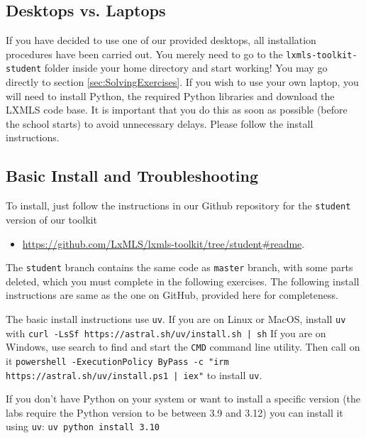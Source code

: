 \subsection{Desktops vs. Laptops}

If you have decided to use one of our provided desktops, all installation procedures have been carried out. You merely need to go to the \verb+lxmls-toolkit-student+ folder inside your home directory and start working! You may go directly to section \ref{sec:SolvingExercises}. If you wish to use your own laptop, you will need to install Python, the required Python libraries and download the LXMLS code base. It is important that you do this as soon as possible (before the school starts) to avoid unnecessary delays. Please follow the install instructions. 

\subsection{Basic Install and Troubleshooting}

To install, just follow the instructions in our Github repository for the \verb+student+ version of our toolkit 

\begin{itemize}
\item \url{https://github.com/LxMLS/lxmls-toolkit/tree/student#readme}. 
\end{itemize}

The \verb+student+ branch contains the same code as \verb+master+ branch, with some parts deleted, which you must complete in the following exercises. 
The following install instructions are same as the one on GitHub, provided here for completeness.

\noindent The basic install instructions use \texttt{uv}. 
If you are on Linux or MacOS, install \texttt{uv} with \newline
\texttt{curl -LsSf https://astral.sh/uv/install.sh | sh}\newline
If you are on Windows, use search to find and start the \texttt{CMD} command line utility. Then call on it \newline
\texttt{powershell -ExecutionPolicy ByPass -c "irm https://astral.sh/uv/install.ps1 | iex"} to install \texttt{uv}.

If you don't have Python on your system or want to install a specific version (the labs require the Python version to be between 3.9 and 3.12) you can install it using \texttt{uv}:\newline
\texttt{uv python install 3.10} \newline

